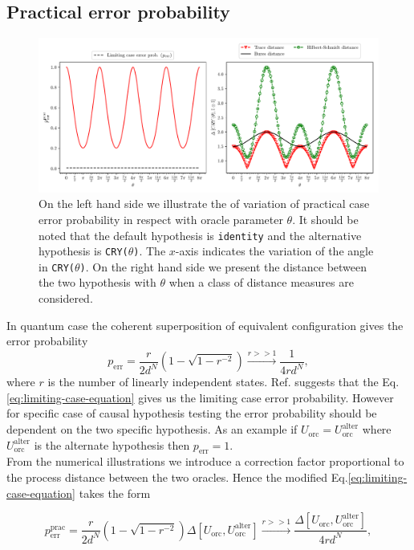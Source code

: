 \documentclass[%
 aps,
 jmp,%
 amsmath,amssymb,
 reprint,%
]{revtex4-2}
\begin{document}
\subsection{ Practical error probability}
\begin{figure}
	\centering
	\includegraphics[width = \linewidth]{plot/limiting_error_prob.pdf}
	\caption{On the left hand side we illustrate the of variation of practical case error probability in respect with oracle parameter $\theta$. It should be noted that the default hypothesis is \texttt{identity} and the alternative hypothesis is \texttt{CRY($\theta$)}. The $x$-axis indicates the variation of the angle in \texttt{CRY($\theta$)}. On the right hand side we present the distance between the two hypothesis with $\theta$ when a class of distance measures are considered.}
	\label{fig:practical-case-error-plot}
\end{figure}
In quantum case the coherent superposition of equivalent configuration gives the error probability \cite{chiribella2019quantum}
\begin{equation}
p_\textrm{err} = \frac{r}{2d^N}\left( 1-\sqrt{1-r^{-2}} \right) \xrightarrow[]{r>>1}\frac{1}{4rd^N},\label{eq:limiting-case-equation}
\end{equation}
where $r$ is the number of linearly independent states. Ref.\cite{chiribella2019quantum} suggests that the Eq.\eqref{eq:limiting-case-equation} gives us the limiting case error probability. However for specific case of causal hypothesis testing the error probability should be dependent on the two specific hypothesis. As an example if $U_\textrm{orc} = U_\textrm{orc}^\textrm{alter}$ where $U_\textrm{orc}^\textrm{alter}$ is the alternate hypothesis then $p_\textrm{err} =1$.\\
From the numerical illustrations we introduce a correction factor proportional to the process distance between the two oracles. Hence the modified Eq.\eqref{eq:limiting-case-equation} takes the form
\begin{widetext}
\begin{equation}
p_\textrm{err}^\textrm{prac} = \frac{r}{2d^N}\left( 1-\sqrt{1-r^{-2}} \right)\Delta\left[U_\textrm{orc}, U_\textrm{orc}^\textrm{alter}\right] \xrightarrow[]{r>>1}\frac{\Delta\left[U_\textrm{orc}, U_\textrm{orc}^\textrm{alter}\right]}{4rd^N},\label{eq:practical-case-equation}
\end{equation}
\end{widetext}
\end{document}

